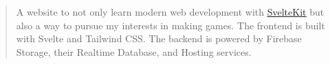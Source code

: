 \begin{cvparagraph}
\begin{quote}
\thinspace A website to not only learn modern web development with \href{https://kit.svelte.dev/}{\underline{SvelteKit}} but also a way to pursue my interests in making games. The 
frontend is built with Svelte and Tailwind CSS. The backend is powered by Firebase Storage, their Realtime Database, and Hosting services. 
\end{quote}



\end{cvparagraph}
